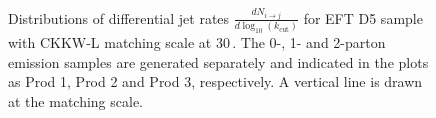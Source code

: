 \begin{figure}[h!]
	\centering  
	\hfill
	\hfill
	\hfill
	\caption{Distributions of differential jet rates $\frac{dN_{i\to j}}{d \log_{10}(k_\textrm{cut})}$ for EFT D5 sample with CKKW-L matching scale at 30\,\gev. The 0-, 1- and 2-parton emission samples are generated separately and indicated in the plots as Prod 1, Prod 2 and Prod 3, respectively. A vertical line is drawn at the matching scale.}
	\label{fig:CKKW_D5_30}
\end{figure}


